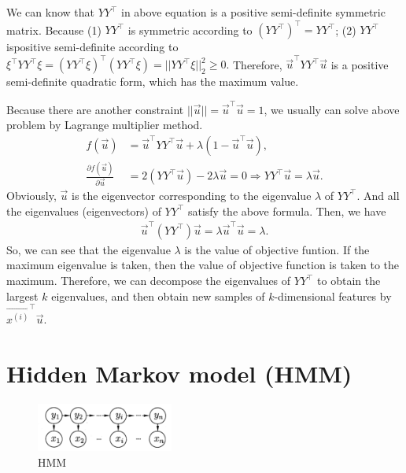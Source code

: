 \documentclass[10pt,onecolumn]{book}
\begin{document}
We can know that $Y Y^\top$ in above equation is a positive semi-definite symmetric matrix. Because (1) $Y Y^\top$ is symmetric according to $(YY^\top)^\top = YY^\top$; (2) $Y Y^\top$ ispositive semi-definite according to $\xi^\top Y Y^\top \xi = (Y Y^\top \xi)^\top(Y Y^\top \xi) = ||Y Y^\top \xi||_2^2 \geq 0.$ Therefore, $\vec{u}^\top Y Y^\top \vec{u}$ is a positive semi-definite quadratic form, which has the maximum value.

Because there are another constraint $||\vec{u}|| = \vec{u}^\top \vec{u} = 1$, we usually can solve above problem by Lagrange multiplier method.
\begin{equation}
\begin{split}
f(\vec{u}) &= \vec{u}^\top Y Y^\top \vec{u} + \lambda (1 - \vec{u}^\top \vec{u}), \\
\frac{\partial f(\vec{u})}{\partial \vec{u}} &= 2 (Y Y^\top \vec{u}) - 2 \lambda \vec{u} = 0 \Rightarrow Y Y^\top \vec{u} = \lambda \vec{u}.
\end{split}
\end{equation}
Obviously, $\vec{u}$ is the eigenvector corresponding to the eigenvalue $\lambda$ of $Y Y^\top$. And all the eigenvalues (eigenvectors) of $Y Y^\top$ satisfy the above formula. Then, we have
\begin{equation}
\begin{split}
\vec{u}^\top \left(Y Y^\top \right)\vec{u} = \lambda \vec{u}^\top \vec{u} = \lambda.
\end{split}
\end{equation}
So, we can see that the eigenvalue $\lambda$ is the value of objective funtion. If the maximum eigenvalue is taken, then the value of objective function is taken to the maximum. Therefore, we can decompose the eigenvalues of $Y Y^\top$ to obtain the largest $k$ eigenvalues, and then obtain new samples of $k$-dimensional features by $\overrightarrow{x^{(i)}}^\top \vec{u}$.

\section{Hidden Markov model (HMM)}
\begin{figure}[h]
\label{fig:hmm}
\centering
\includegraphics[width=0.4\textwidth]{figures/hmm.png}
\caption{HMM}
\end{figure}
\end{document}
